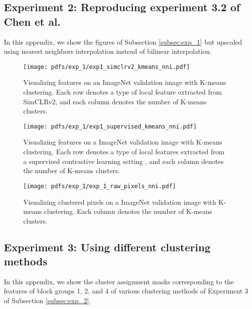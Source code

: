 \subsection{Experiment 2: Reproducing experiment 3.2 of Chen et al. \cite{chen2021intriguing}}
\label{appendix:nni}



In this appendix, we show the figures of Subsection \ref{subsec:exp_1} but upscaled using nearest neighbors interpolation instead of bilinear interpolation. 



    \begin{figure}[H]
        \centering
        \texttt{[image: pdfs/exp\_1/exp1\_simclrv2\_kmeans\_nni.pdf]}
        \caption{Visualizing features on an ImageNet validation image with K-means clustering. Each row denotes a type of local feature extracted from SimCLRv2, and each column denotes the number of K-means clusters.}
        \label{fig:exp3.2_ours_nni}
    \end{figure}

    \begin{figure}[H]
        \centering
        \texttt{[image: pdfs/exp\_1/exp1\_supervised\_kmeans\_nni.pdf]}
        \caption{Visualizing features on a ImageNet validation image with K-means clustering. Each row denotes a type of local features extracted from a supervised contrastive learning setting%
        , and each column denotes the number of K-means clusters.}
        \label{fig:exp3.2_supervised_nni}
    \end{figure}
    
    
    \begin{figure}[H]
        \centering
        \texttt{[image: pdfs/exp\_1/exp\_1\_raw\_pixels\_nni.pdf]}
        \caption{Visualizing clustered pixels on a ImageNet validation image with K-means clustering. Each column denotes the number of K-means clusters.}
        \label{fig:exp3.2_ours_raw_pixels_nni}
    \end{figure}

\subsection{Experiment 3: Using different clustering methods}
\label{appendix:exp2}

In this appendix, we show the cluster assignment masks corresponding to the features of block groups 1, 2, and 4 of various clustering methods of Experiment 3 of Subsection \ref{subsec:exp_2}.

